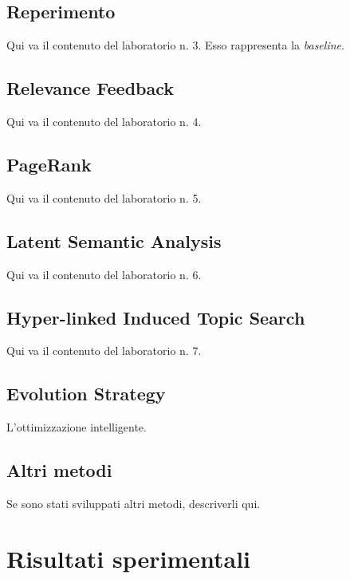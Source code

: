 \documentclass{llncs}
\begin{document}
\subsection{Reperimento}
\label{sec:metodi-di-reper}

Qui va il contenuto del laboratorio n. 3. Esso rappresenta la \textit{baseline}.

\subsection{Relevance Feedback}
\label{sec:relevance-feedback}

Qui va il contenuto del laboratorio n. 4.

\subsection{PageRank}
\label{sec:pagerank}

Qui va il contenuto del laboratorio n. 5.

\subsection{Latent Semantic Analysis}
\label{sec:lsa}

Qui va il contenuto del laboratorio n. 6.

\subsection{Hyper-linked Induced Topic Search}
\label{sec:hits}

Qui va il contenuto del laboratorio n. 7.

\subsection{Evolution Strategy}
\label{sec:es}

L'ottimizzazione intelligente.

\subsection{Altri metodi}
\label{sec:altri-metodi}

Se sono stati sviluppati altri metodi, descriverli qui.

\section{Risultati sperimentali}
\label{sec:risult-sper}
\end{document}
